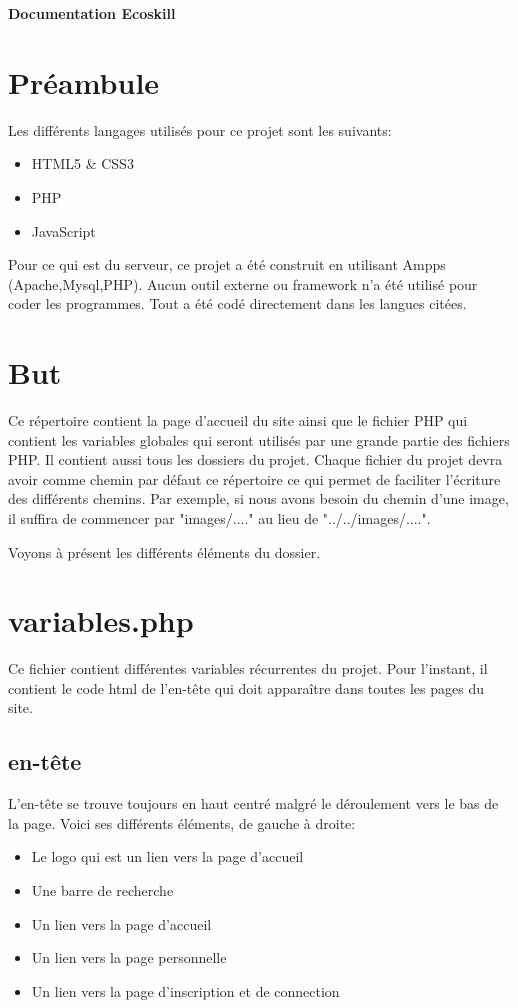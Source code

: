 \documentclass[a4paper]{article}
\begin{document}
\begin{center}
\LARGE\textbf{Documentation Ecoskill}

\end{center}

\section*{Préambule}
Les différents langages utilisés pour ce projet sont les suivants:
	\begin{itemize}
		\item HTML5 \& CSS3
		\item PHP
		\item JavaScript
	\end{itemize}

Pour ce qui est du serveur, ce projet a été construit en utilisant Ampps (Apache,Mysql,PHP). Aucun outil externe ou framework n'a été utilisé pour coder les programmes. Tout a été codé directement dans les langues citées.

\section{But}
Ce répertoire contient la page d'accueil du site ainsi que le fichier PHP qui contient les variables globales qui seront utilisés par une grande partie des fichiers PHP. Il contient aussi tous les dossiers du projet. Chaque fichier du projet devra avoir comme chemin par défaut ce répertoire ce qui permet de faciliter l'écriture des différents chemins. Par exemple, si nous avons besoin du chemin d'une image, il suffira de commencer par "images/...." au lieu de "../../images/....".

Voyons à présent les différents éléments du dossier.

\section{variables.php}

Ce fichier contient différentes variables récurrentes du projet. Pour l'instant, il contient le code html de l'en-tête qui doit apparaître dans toutes les pages du site.
	\subsection{en-tête}
	L'en-tête se trouve toujours en haut centré malgré le déroulement vers le bas de la page. Voici ses différents éléments, de gauche à droite:
	\begin{itemize}
		\item Le logo qui est un lien vers la page d'accueil
		\item Une barre de recherche
		\item Un lien vers la page d'accueil
		\item Un lien vers la page personnelle
		\item Un lien vers la page d'inscription et de connection
	\end{itemize}
\end{document}
